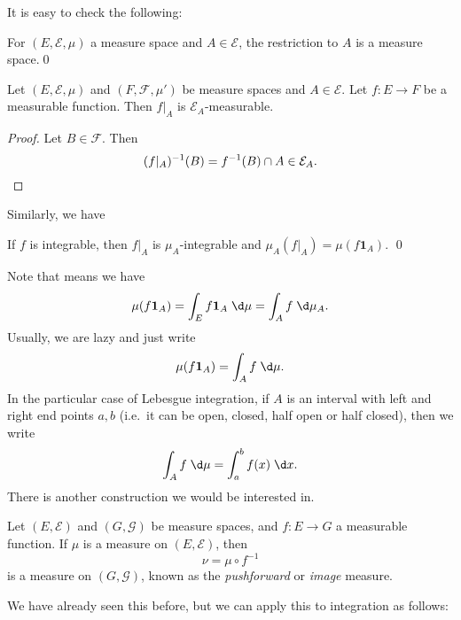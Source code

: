 \documentclass[a4paper]{article}
\begin{document}
It is easy to check the following:
\begin{lemma}
  For $(E, \mathcal{E}, \mu)$ a measure space and $A \in \mathcal{E}$, the restriction to $A$ is a measure space.\qed
\end{lemma}

%
%
%
%

\begin{prop}
  Let $(E, \mathcal{E}, \mu)$ and $(F, \mathcal{F}, \mu')$ be measure spaces and $A \in \mathcal{E}$. Let $f: E \to F$ be a measurable function. Then $f|_A$ is $\mathcal{E}_A$-measurable.
\end{prop}

\begin{proof}
  Let $B \in \mathcal{F}$. Then
  \[
    (f|_A)^{-1}(B) = f^{-1}(B) \cap A \in \mathcal{E}_A.\qedhere
  \]
\end{proof}

Similarly, we have
\begin{prop}
  If $f$ is integrable, then $f|_A$ is $\mu_A$-integrable and $\mu_A(f|_A) = \mu (f\mathbf{1}_A)$. \qed
\end{prop}

Note that means we have
\[
  \mu(f\mathbf{1}_A) = \int_E f\mathbf{1}_A \;\d \mu = \int_A f \;\d \mu_A.
\]
Usually, we are lazy and just write
\[
  \mu(f\mathbf{1}_A) = \int_A f\;\d \mu.
\]
In the particular case of Lebesgue integration, if $A$ is an interval with left and right end points $a, b$ (i.e.\ it can be open, closed, half open or half closed), then we write
\[
  \int_A f\;\d \mu = \int_a^b f(x) \;\d x.
\]
There is another construction we would be interested in.
\begin{defi}
  Let $(E, \mathcal{E})$ and $(G, \mathcal{G})$ be measure spaces, and $f: E \to G$ a measurable function. If $\mu$ is a measure on $(E, \mathcal{E})$, then
  \[
    \nu = \mu \circ f^{-1}
  \]
  is a measure on $(G, \mathcal{G})$, known as the \emph{pushforward} or \emph{image} measure.
\end{defi}
We have already seen this before, but we can apply this to integration as follows:
\end{document}
